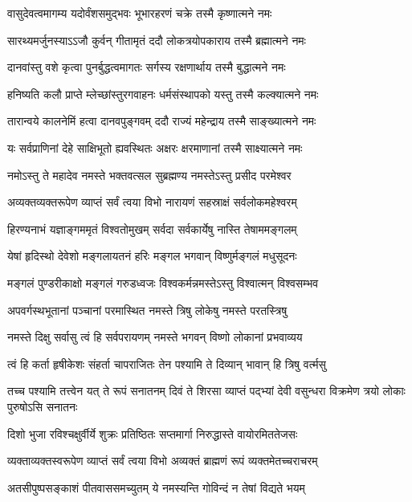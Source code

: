 \twolineshloka
{वासुदेवत्वमागम्य यदोर्वंशसमुद्भवः}
{भूभारहरणं चक्रे तस्मै कृष्णात्मने नमः} %


\twolineshloka
{सारथ्यमर्जुनस्याऽऽजौ कुर्वन् गीतामृतं ददौ}
{लोकत्रयोपकाराय तस्मै ब्रह्मात्मने नमः} %


\twolineshloka
{दानवांस्तु वशे कृत्वा पुनर्बुद्धत्वमागतः}
{सर्गस्य रक्षणार्थाय तस्मै बुद्धात्मने नमः} %


\twolineshloka
{हनिष्यति कलौ प्राप्ते म्लेच्छांस्तुरगवाहनः}
{धर्मसंस्थापको यस्तु तस्मै कल्क्यात्मने नमः} %


\twolineshloka
{तारान्वये कालनेमिं हत्वा दानवपुङ्गवम्}
{ददौ राज्यं महेन्द्राय तस्मै साङ्ख्यात्मने नमः} %


\twolineshloka
{यः सर्वप्राणिनां देहे साक्षिभूतो ह्यवस्थितः}
{अक्षरः क्षरमाणानां तस्मै साक्ष्यात्मने नमः} %


\twolineshloka
{नमोऽस्तु ते महादेव नमस्ते भक्तवत्सल}
{सुब्रह्मण्य नमस्तेऽस्तु प्रसीद परमेश्वर} %


\twolineshloka
{अव्यक्तव्यक्तरूपेण व्याप्तं सर्वं त्वया विभो}
{नारायणं सहस्राक्षं सर्वलोकमहेश्वरम्} %


\twolineshloka
{हिरण्यनाभं यज्ञाङ्गममृतं विश्वतोमुखम्}
{सर्वदा सर्वकार्येषु नास्ति तेषाममङ्गलम्} %


\twolineshloka
{येषां हृदिस्थो देवेशो मङ्गलायतनं हरिः}
{मङ्गल भगवान् विष्णुर्मङ्गलं मधुसूदनः} %


\twolineshloka
{मङ्गलं पुण्डरीकाक्षो मङ्गलं गरुडध्वजः}
{विश्वकर्मन्नमस्तेऽस्तु विश्वात्मन् विश्वसम्भव} %


\twolineshloka
{अपवर्गस्थभूतानां पञ्चानां परमास्थित}
{नमस्ते त्रिषु लोकेषु नमस्ते परतस्त्रिषु} %


\twolineshloka
{नमस्ते दिक्षु सर्वासु त्वं हि सर्वपरायणम्}
{नमस्ते भगवन् विष्णो लोकानां प्रभवाव्यय} %


\twolineshloka
{त्वं हि कर्ता हृषीकेशः संहर्ता चापराजितः}
{तेन पश्यामि ते दिव्यान् भावान् हि त्रिषु वर्त्मसु} %


\threelineshloka
{तच्च पश्यामि तत्त्वेन यत् ते रूपं सनातनम्}
{दिवं ते शिरसा व्याप्तं पद्भ्यां देवी वसुन्धरा}
{विक्रमेण त्रयो लोकाः पुरुषोऽसि सनातनः} %


\twolineshloka
{दिशो भुजा रविश्चक्षुर्वीर्ये शुक्रः प्रतिष्ठितः}
{सप्तमार्गा निरुद्धास्ते वायोरमिततेजसः} %


\twolineshloka
{व्यक्ताव्यक्तस्वरूपेण व्याप्तं सर्वं त्वया विभो}
{अव्यक्तं ब्राह्मणं रूपं व्यक्तमेतच्चराचरम्} %


\twolineshloka
{अतसीपुष्पसङ्काशं पीतवाससमच्युतम्}
{ये नमस्यन्ति गोविन्दं न तेषां विद्यते भयम्} %


